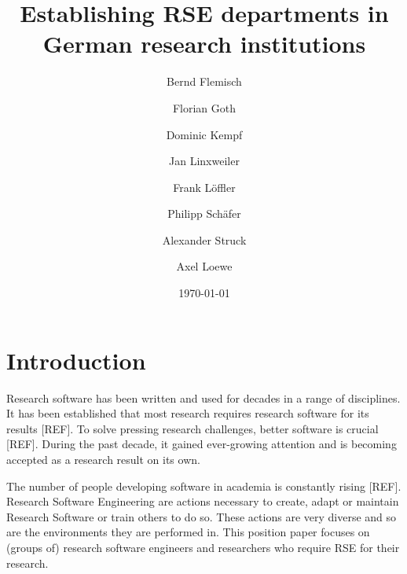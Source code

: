 \documentclass{article}
\title{Establishing RSE departments in German research institutions}
\author{
    Bernd Flemisch
    \and
    Florian Goth
    \and
    Dominic Kempf
    \and
    Jan Linxweiler
    \and
    Frank Löffler
    \and
    Philipp Schäfer
    \and
    Alexander Struck
    \and
    Axel Loewe
}
\date{\today}
\begin{document}
\maketitle

\section{Introduction}
Research software has been written and used for decades in a range of disciplines.
It has been established that most research requires research software for its results [REF].
To solve pressing research challenges, better software is crucial [REF].
During the past decade, it gained ever-growing attention and is becoming accepted as a research result on its own.

The number of people developing software in academia is constantly rising [REF].
Research Software Engineering are actions necessary to create, adapt or maintain Research Software or train others to do so.
These actions are very diverse and so are the environments they are performed in.
This position paper focuses on (groups of) research software engineers and researchers who require RSE for their research.
\end{document}
